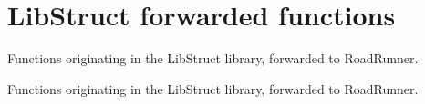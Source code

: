 \hypertarget{group___lib_struct}{\section{Lib\-Struct forwarded functions}
\label{group___lib_struct}
}


Functions originating in the Lib\-Struct library, forwarded to Road\-Runner.  


Functions originating in the Lib\-Struct library, forwarded to Road\-Runner. 